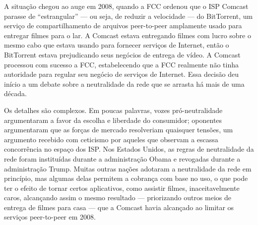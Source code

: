 A situação chegou ao auge em 2008, quando a FCC ordenou que o ISP Comcast parasse de
``estrangular'' --- ou seja, de reduzir a velocidade --- do BitTorrent, um serviço de
compartilhamento de arquivos peer-to-peer amplamente usado para entregar filmes para o lar.
A Comcast estava entregando filmes com lucro sobre o mesmo cabo que estava usando para
fornecer serviços de Internet, então o BitTorrent estava prejudicando seus negócios de entrega
de vídeo. A Comcast processou com sucesso a FCC, estabelecendo que a FCC realmente não tinha
autoridade para regular seu negócio de serviços de Internet. Essa decisão deu início a um
debate sobre a neutralidade da rede que se arrasta há mais de uma década.

Os detalhes são complexos. Em poucas palavras, vozes pró-neutralidade argumentaram a favor
da escolha e liberdade do consumidor; oponentes argumentaram que as forças de mercado
resolveriam quaisquer tensões, um argumento recebido com ceticismo por aqueles que observam
a escassa concorrência no espaço dos ISP. Nos Estados Unidos, as regras de neutralidade da
rede foram instituídas durante a administração Obama e revogadas durante a administração
Trump. Muitas outras nações adotaram a neutralidade da rede em princípio, mas algumas delas
permitem a cobrança com base no uso, o que pode ter o efeito de tornar certos aplicativos,
como assistir filmes, inaceitavelmente caros, alcançando assim o mesmo resultado ---
priorizando outros meios de entrega de filmes para casa --- que a Comcast havia alcançado ao
limitar os serviços peer-to-peer em 2008.